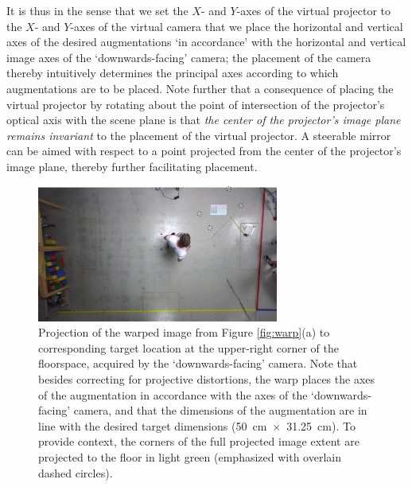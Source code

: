 \documentclass[review]{elsarticle}
\begin{document}
It is thus in the sense that we set the $X$- and $Y$-axes of the virtual projector to the $X$- and $Y$-axes of the virtual camera that we place the horizontal and vertical axes of the desired augmentations `in accordance' with the horizontal and vertical image axes of the `downwards-facing' camera; the placement of the camera thereby intuitively determines the principal axes according to which augmentations are to be placed. Note further that a consequence of placing the virtual projector by rotating about the point of intersection of the projector's optical axis with the scene plane is that \textit{the center of the projector's image plane remains invariant} to the placement of the virtual projector. A steerable mirror can be aimed with respect to a point projected from the center of the projector's image plane, thereby further facilitating placement.

\begin{figure}
    \centering
    \includegraphics[height=4.5cm]{images/hans_undist_.pdf}
    \caption{Projection of the warped image from Figure \ref{fig:warp}(a) to corresponding target location at the upper-right corner of the floorspace, acquired by the `downwards-facing' camera. Note that besides correcting for projective distortions, the warp places the axes of the augmentation in accordance with the axes of the `downwards-facing' camera, and that the dimensions of the augmentation are in line with the desired target dimensions (50~cm~$\times$~31.25~cm). To provide context, the corners of the full projected image extent are projected to the floor in light green (emphasized with overlain dashed circles).}
    \label{fig:final_proj}
\end{figure}
\end{document}
